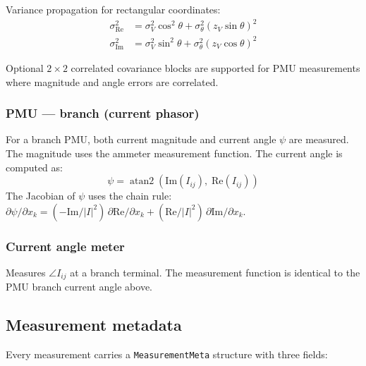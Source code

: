 \documentclass[11pt,a4paper]{article}
\begin{document}
\noindent
Variance propagation for rectangular coordinates:
\begin{align}
  \sigma_\text{Re}^2 &= \sigma_V^2\cos^2\theta + \sigma_\theta^2(z_V\sin\theta)^2 \\
  \sigma_\text{Im}^2 &= \sigma_V^2\sin^2\theta + \sigma_\theta^2(z_V\cos\theta)^2
\end{align}

\noindent
Optional $2\times2$ correlated covariance blocks are supported for PMU
measurements where magnitude and angle errors are correlated.

\subsubsection{PMU --- branch (current phasor)}

For a branch PMU, both current magnitude and current angle $\psi$ are
measured.  The magnitude uses the ammeter measurement function.  The
current angle is computed as:
\begin{equation}
  \psi = \operatorname{atan2}(\text{Im}(I_{ij}),\; \text{Re}(I_{ij}))
\end{equation}
The Jacobian of $\psi$ uses the chain rule:
$\partial\psi/\partial x_k = (-\text{Im}/|I|^2)\,\partial\text{Re}/\partial x_k
  + (\text{Re}/|I|^2)\,\partial\text{Im}/\partial x_k$.

\subsubsection{Current angle meter}

Measures $\angle I_{ij}$ at a branch terminal.  The measurement function
is identical to the PMU branch current angle above.

\subsection{Measurement metadata}\label{sec:meta}

Every measurement carries a \texttt{MeasurementMeta} structure with three
fields:
\end{document}
